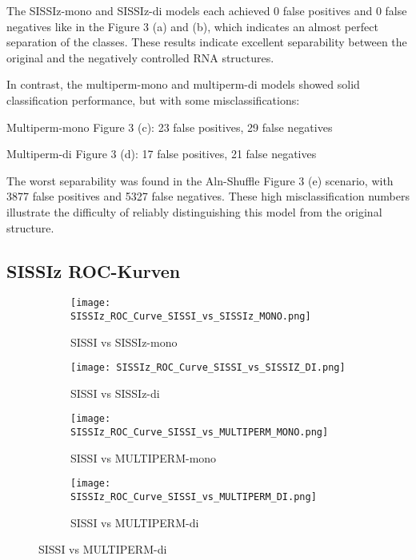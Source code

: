 \documentclass{article}
\begin{document}
\begin{large}
\begin{large}
\begin{large}
The SISSIz-mono and SISSIz-di models each achieved 0 false positives and 0 false negatives like in the Figure 3 (a) and (b), which indicates an almost perfect separation of the classes. These results indicate excellent separability between the original and the negatively controlled RNA structures.\vspace{1em}

In contrast, the multiperm-mono and multiperm-di models showed solid classification performance, but with some misclassifications:\vspace{1em}

Multiperm-mono Figure 3 (c): 23 false positives, 29 false negatives

Multiperm-di Figure 3 (d): 17 false positives, 21 false negatives
\vspace{1em}

The worst separability was found in the Aln-Shuffle Figure 3 (e) scenario, with 3877 false positives and 5327 false negatives. These high misclassification numbers illustrate the difficulty of reliably distinguishing this model from the original structure.\vspace{1em}

\subsection{SISSIz ROC-Kurven}

\begin{figure}[H]
    \centering
    \begin{subfigure}[b]{0.48\textwidth}
        \texttt{[image: SISSIz\_ROC\_Curve\_SISSI\_vs\_SISSIz\_MONO.png]}
        \caption{SISSI vs SISSIz-mono}
    \end{subfigure}
    \hfill
    \begin{subfigure}[b]{0.48\textwidth}
        \texttt{[image: SISSIz\_ROC\_Curve\_SISSI\_vs\_SISSIZ\_DI.png]}
        \caption{SISSI vs SISSIz-di}
    \end{subfigure}
    \vspace{1em}

    \begin{subfigure}[b]{0.48\textwidth}
        \texttt{[image: SISSIz\_ROC\_Curve\_SISSI\_vs\_MULTIPERM\_MONO.png]}
        \caption{SISSI vs MULTIPERM-mono}
    \end{subfigure}
    \hfill
    \begin{subfigure}[b]{0.48\textwidth}
        \texttt{[image: SISSIz\_ROC\_Curve\_SISSI\_vs\_MULTIPERM\_DI.png]}
        \caption{SISSI vs MULTIPERM-di}
    \end{subfigure}
    \vspace{1em}


\end{figure}
\end{large}
\end{large}
\end{large}
\end{document}

